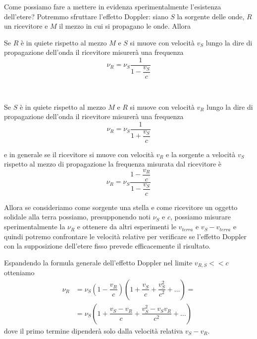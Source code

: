 \documentclass[12pt,a4paper,titlepage, twoside, openright]{book}
\numberwithin{equation}{chapter}
\begin{document}
Come possiamo fare a mettere in evidenza sperimentalmente l'esistenza dell'etere?
Potremmo sfruttare l'effetto Doppler: siano $S$ la sorgente delle onde, $R$ un ricevitore e $M$ il mezzo in cui si propagano le onde. Allora

\begin{table}[H]
\flushright
\begin{minipage}[H]{0.47\linewidth}
Se $R$ è in quiete rispetto al mezzo $M$ e $S$ si muove con velocità $v_S$ lungo la dire di propagazione dell'onda il ricevitore misurerà una frequenza
\begin{equation}
\nu_R=\nu_S\dfrac{1}{1-\dfrac{v_S}{c}}
\end{equation}
\end{minipage}
\begin{minipage}[H]{0.05\linewidth}
$ $
\end{minipage}
\begin{minipage}[H]{0.46\linewidth}
Se $S$ è in quiete rispetto al mezzo $M$ e $R$ si muove con velocità $v_R$ lungo la dire di propagazione dell'onda il ricevitore misurerà una frequenza
\begin{equation}
\nu_R=\nu_S\dfrac{1}{1+\dfrac{v_S}{c}}
\end{equation}
\end{minipage}
\end{table}

e in generale se il ricevitore si muove con velocità $v_R$ e la sorgente a velocità $v_S$ rispetto al mezzo di propagazione la frequenza misurata dal ricevitore è
\begin{equation}
\nu_R = \nu_S \dfrac{1-\dfrac{v_R}{c}}{1-\dfrac{v_S}{c}}
\end{equation}

Allora se consideriamo come sorgente una stella e come ricevitore un oggetto solidale alla terra possiamo, presupponendo noti $\nu_S$ e $c$, possiamo misurare sperimentalmente la $\nu_R$ e ottenere da altri esperimenti le $v_{terra}$ e $v_S-v_{terra}$ e quindi potremo confrontare le velocità relative per verificare se l'effetto Doppler con la supposizione dell'etere fisso prevede efficacemente il risultato.

Espandendo la formula generale dell'effetto Doppler nel limite $v_{R,S}<<c$ otteniamo
\begin{align*}
\nu_R &= \nu_S \left(1-\dfrac{v_R}{c} \right) \left(1+\dfrac{v_S}{c}+\dfrac{v_S^2}{c^2}+\dots\right)= \\ &=  
\nu_S \left(1+\dfrac{v_S-v_R}{c}+\dfrac{v_S^2-v_Sv_R}{c^2}+\dots \right)
\end{align*}
dove il primo termine dipenderà solo dalla velocità relativa $v_S-v_R$.
\end{document}
